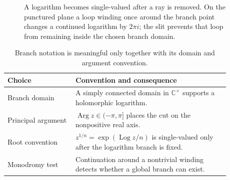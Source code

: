 \begin{figure}[htbp]
\centering
{}
\caption{A logarithm becomes single-valued after a ray is removed. On the punctured
plane a loop winding once around the branch point changes a continued logarithm by
$2\pi i$; the slit prevents that loop from remaining inside the chosen branch domain.}
\label{fig:iv14-c07-branch-cut}
\end{figure}

\begin{table}[htbp]
\centering\small
\begin{tabular}{p{0.27\linewidth}p{0.61\linewidth}}
\toprule
Choice & Convention and consequence\\
\midrule
Branch domain & A simply connected domain in $\mathbb C^\times$ supports a holomorphic logarithm.\\
Principal argument & $\operatorname{Arg} z\in(-\pi,\pi]$ places the cut on the nonpositive real axis.\\
Root convention & $z^{1/n}=\exp(\operatorname{Log} z/n)$ is single-valued only after the logarithm branch is fixed.\\
Monodromy test & Continuation around a nontrivial winding detects whether a global branch can exist.\\
\bottomrule
\end{tabular}
\caption{Branch notation is meaningful only together with its domain and argument convention.}
\label{tab:iv14-c07-branch-conventions}
\end{table}
